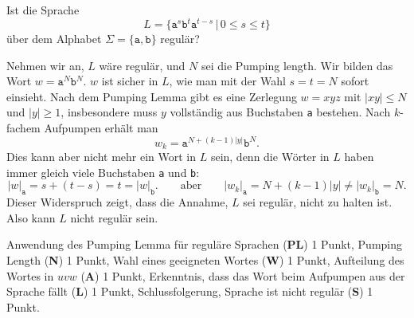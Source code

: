 Ist die Sprache
\[
L=\{
\texttt{a}^s
\texttt{b}^t
\texttt{a}^{t-s}
\,|\, 0\le s\le t
\}
\]
über dem Alphabet $\Sigma=\{\texttt{a},\texttt{b}\}$ regulär?


\begin{loesung}
Nehmen wir an, $L$ wäre regulär, und $N$ sei die Pumping length. 
Wir bilden das Wort $w=\texttt{a}^N\texttt{b}^N$. $w$ ist sicher in $L$,
wie man mit der Wahl $s=t=N$ sofort einsieht. 
Nach dem Pumping Lemma gibt es eine Zerlegung $w=xyz$ mit $|xy|\le N$
und $|y|\ge 1$,
insbesondere muss $y$ vollständig aus Buchstaben \texttt{a} bestehen.
Nach $k$-fachem Aufpumpen erhält man
\[
w_k=\texttt{a}^{N+(k-1)|y|}\texttt{b}^N.
\]
Dies kann aber nicht mehr ein Wort in $L$ sein, denn die Wörter in $L$
haben immer gleich viele Buchstaben \texttt{a} und \texttt{b}:
\[
|w|_{\texttt{a}}
=s+(t-s)=t=
|w|_{\texttt{b}}.
\qquad\text{aber}\qquad
|w_k|_{\texttt{a}}
=N+(k-1)|y|\ne
|w_k|_{\texttt{b}}=N.
\]
Dieser Widerspruch zeigt, dass die Annahme, $L$ sei regulär, nicht zu
halten ist. Also kann $L$ nicht regulär sein.
\end{loesung}

\begin{bewertung}
Anwendung des Pumping Lemma für reguläre Sprachen ({\bf PL}) 1 Punkt,
Pumping Length ({\bf N}) 1 Punkt,
Wahl eines geeigneten Wortes ({\bf W}) 1 Punkt,
Aufteilung des Wortes in $uvw$ ({\bf A}) 1 Punkt,
Erkenntnis, dass das Wort beim Aufpumpen aus der Sprache fällt ({\bf L})
1 Punkt,
Schlussfolgerung, Sprache ist nicht regulär ({\bf S}) 1 Punkt.
\end{bewertung}

